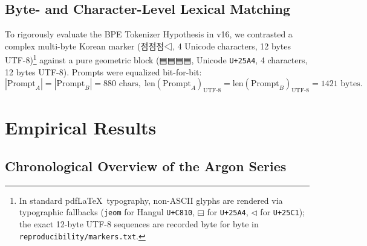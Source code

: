 \documentclass[11pt,a4paper]{article}
\newcommand{\marker}[1]{{\normalfont\markerfont #1}}
\newcommand{\marker}[1]{\texttt{#1}}
\newcommand{\marker}[1]{\texttt{#1}}
\begin{document}
\subsection{Byte- and Character-Level Lexical Matching}
To rigorously evaluate the BPE Tokenizer Hypothesis in v16, we contrasted a complex multi-byte Korean marker (\marker{점점점◁}, 4 Unicode characters, 12 bytes UTF-8)\footnote{In standard pdf\LaTeX\ typography, non-ASCII glyphs are rendered via typographic fallbacks (\texttt{jeom} for Hangul \texttt{U+C810}, $\boxminus$ for \texttt{U+25A4}, $\triangleleft$ for \texttt{U+25C1}); the exact 12-byte UTF-8 sequences are recorded byte for byte in \texttt{reproducibility/markers.txt}.} against a pure geometric block (\marker{▤▤▤▤}, Unicode \texttt{U+25A4}, 4 characters, 12 bytes UTF-8). Prompts were equalized bit-for-bit:
\begin{equation}
    |\text{Prompt}_A| = |\text{Prompt}_B| = 880 \text{ chars}, \; \text{len}(\text{Prompt}_A)_{\text{UTF-8}} = \text{len}(\text{Prompt}_B)_{\text{UTF-8}} = 1421 \text{ bytes}.
\end{equation}

\section{Empirical Results}

\subsection{Chronological Overview of the Argon Series}
\end{document}
